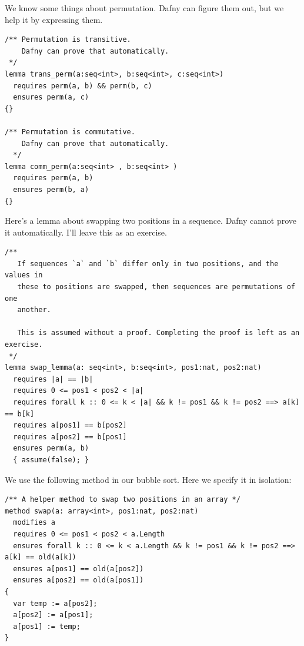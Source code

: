 \documentclass[11pt]{article}
\begin{document}
We know some things about permutation. Dafny can figure them out, but we help it by expressing them.
\begin{lstlisting}[language=dafny]
/** Permutation is transitive.
    Dafny can prove that automatically.
 */
lemma trans_perm(a:seq<int>, b:seq<int>, c:seq<int>)
  requires perm(a, b) && perm(b, c)
  ensures perm(a, c)
{}

/** Permutation is commutative.
    Dafny can prove that automatically.
  */
lemma comm_perm(a:seq<int> , b:seq<int> )
  requires perm(a, b)
  ensures perm(b, a)
{}
\end{lstlisting}


Here's a lemma about swapping two positions in a sequence. Dafny cannot prove it automatically.
I'll leave this as an exercise.

\begin{lstlisting}[language=dafny]
/**
   If sequences `a` and `b` differ only in two positions, and the values in
   these to positions are swapped, then sequences are permutations of one
   another.

   This is assumed without a proof. Completing the proof is left as an exercise.
 */
lemma swap_lemma(a: seq<int>, b:seq<int>, pos1:nat, pos2:nat)
  requires |a| == |b|
  requires 0 <= pos1 < pos2 < |a|
  requires forall k :: 0 <= k < |a| && k != pos1 && k != pos2 ==> a[k] == b[k]
  requires a[pos1] == b[pos2]
  requires a[pos2] == b[pos1]
  ensures perm(a, b)
  { assume(false); }
\end{lstlisting}

We use the following method in our bubble sort. Here we specify it in isolation:
\begin{lstlisting}[language=dafny]
/** A helper method to swap two positions in an array */
method swap(a: array<int>, pos1:nat, pos2:nat)
  modifies a
  requires 0 <= pos1 < pos2 < a.Length
  ensures forall k :: 0 <= k < a.Length && k != pos1 && k != pos2 ==> a[k] == old(a[k])
  ensures a[pos1] == old(a[pos2])
  ensures a[pos2] == old(a[pos1])
{
  var temp := a[pos2];
  a[pos2] := a[pos1];
  a[pos1] := temp;
}
\end{lstlisting}
\end{document}
